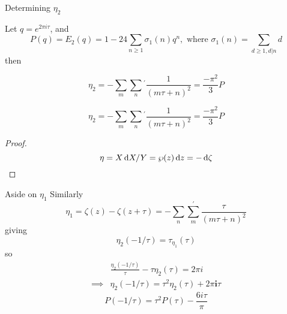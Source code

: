 \begin{frame}{Determining $\eta_2$}

    Let $q = e^{2\pi i \tau}$, and
    \[
        P(q)=E_2(q) =1-
        24 \sum_{n \geq 1} \sigma_{1}(n) q^{n}, \text { where } \sigma_{1}(n)=\sum_{d \geq 1, d | n} d
    \]  then
    \begin{lemma}
        $$
        \eta_{2}=-\sum_{m} \sum_{n}\left.^{\prime}\right. \frac{1}{(m \tau+n)^{2}}=\frac{-\pi^{2}}{3} P
        $$
    \end{lemma}
\end{frame}

\begin{frame}
    \begin{lemma}
        $$
    \eta_{2}=-\sum_{m} \sum_{n}{}^{\prime}\frac{1}{(m \tau+n)^{2}}=\frac{-\pi^{2}}{3} P
        $$
    \end{lemma}
    \begin{proof}
        \[ \eta=X \mathop{}\!\mathrm{d} X / Y=\wp(z) \mathop{}\!\mathrm{d} z = -\mathop{}\!\mathrm{d} \zeta \]
    \end{proof}
\end{frame}

\begin{frame}{Aside on $\eta_1$}
    Similarly
    \[
        \eta_{1}=\zeta(z)-\zeta(z+\tau)=-\sum_{n} \sum_{m}^{\prime} \frac{\tau}{(m \tau+n)^{2}}
    \]
    giving
    \[
        \eta_{2}(-1 / \tau)=\tau_{\eta_{1}}(\tau)
    \]
    so
    \[
        \begin{aligned}
&\frac{\eta_{2}(-1 / \tau)}{\tau}-\tau \eta_{2}(\tau)=2 \pi i\\
\implies&\eta_{2}(-1 / \tau)=\tau^{2} \eta_{2}(\tau)+2 \pi \mathbf{i} \tau
        \end{aligned}
    \]
    \[
        P(-1 / \tau)=\tau^{2} P(\tau)-\frac{6i \tau}{\pi}
    \]
\end{frame}

